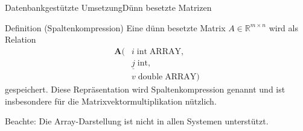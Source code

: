 \documentclass[10pt]{beamer} %
\newcommand{\RR}{\ensuremath{\mathbb{R}}}
\begin{document}
\begin{frame}{Datenbankgestützte Umsetzung}{Dünn besetzte Matrizen}
   \begin{block}{Definition (Spaltenkompression)}
      Eine dünn besetzte Matrix $A \in \RR^{m \times n}$ wird als Relation
\begin{align*}
    \mathbf{A}(&i \; \mathrm{int} \; \mathrm{ARRAY}, \\
               &\underline{j} \; \mathrm{int}, \\
               &v \; \mathrm{double} \; \mathrm{ARRAY}
               )
\end{align*}
gespeichert. Diese Repräsentation wird Spaltenkompression genannt und ist insbesondere für die Matrixvektormultiplikation nützlich.
   \end{block}
   \pause
   Beachte: Die Array-Darstellung ist nicht in allen Systemen unterstützt.
\end{frame}
\end{document}

